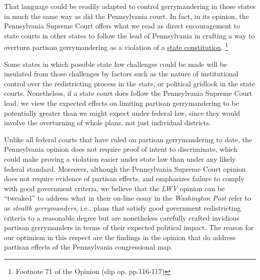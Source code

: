     That language could be readily adapted to control gerrymandering in those states in much the same way as did the Pennsylvania court. In fact, in its opinion, the Pennsylvania Supreme Court offers what we read as direct encouragement to state courts in other states to follow the lead of Pennsylvania in crafting a way to overturn partisan gerrymandering as a violation of a \underline{state constitution}.
        \footnote{Footnote 71 of the Opinion (slip op. pp.116-117)}
\par
    Some states in which possible state law challenges could be made will be insulated from those challenges by factors such as the nature of institutional control over the redistricting process in the state, or political gridlock in the state courts. Nonetheless, if a state court does follow the Pennsylvania Supreme Court lead, we view the expected effects on limiting partisan gerrymandering to be potentially greater than we might expect under federal law, since they would involve the overturning of whole plans, not just individual districts. 
\par
    Unlike all federal courts that have ruled on partisan gerrymandering to date, the Pennsylvania opinion does not require proof of intent to discriminate, which could make proving a violation easier under state law than under any likely federal standard. Moreover, although the Pennsylvania Supreme Court opinion does not require evidence of partisan effects, and emphasizes failure to comply with good government criteria, we believe that the \textit{LWV} opinion can be ``tweaked'' to address what \citet[][see also \citeyear{Grofman_Cervas_2018_ELJ}]{GrofmanCervas2018_WashPo} in their on-line essay in the \textit{Washington Post} refer to as \textit{stealth gerrymanders}, i.e., plans that satisfy good government redistricting criteria to a reasonable degree but are nonetheless carefully crafted invidious partisan gerrymanders in terms of their expected political impact. The reason for our optimism in this respect are the findings in the opinion that do address partisan effects of the Pennsylvania congressional map. 
